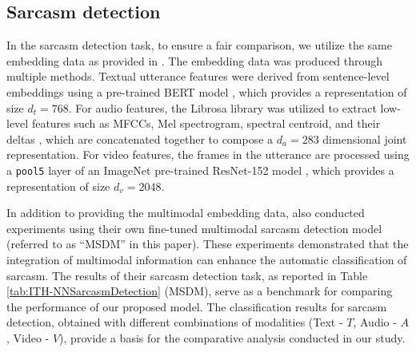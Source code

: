 \documentclass{article} %
\begin{document}
\subsection{Sarcasm detection}
In the sarcasm detection task, to ensure a fair comparison, we utilize the same embedding data as provided in \citet{castro2019towards}. The embedding data was produced through multiple methods. Textual utterance features were derived from sentence-level embeddings using a pre-trained BERT model \citep{devlin2018bert}, which provides a representation of size $d_t = 768$. For audio features, the Librosa library \citep{mcfee2018wzy} was utilized to extract low-level features such as MFCCs, Mel spectrogram, spectral centroid, and their deltas \citep{brian_mcfee_2018_1342708}, which are concatenated together to compose a $d_a = 283$ dimensional joint representation. For video features, the frames in the utterance are processed using a \texttt{pool5} layer of an ImageNet \citep{deng2009imagenet} pre-trained ResNet-152 model \citep{he2016deep}, which provides a representation of size $d_v=2048$.



In addition to providing the multimodal embedding data, \citet{castro2019towards} also conducted experiments using their own fine-tuned multimodal sarcasm detection model (referred to as ``MSDM'' in this paper). These experiments demonstrated that the integration of multimodal information can enhance the automatic classification of sarcasm. The results of their sarcasm detection task, as reported in Table \ref{tab:ITH-NNSarcasmDetection} (MSDM), serve as a benchmark for comparing the performance of our proposed model. The classification results for sarcasm detection, obtained with different combinations of modalities (Text - $T$, Audio - $A$, Video - $V$), provide a basis for the comparative analysis conducted in our study. 


\end{document}
